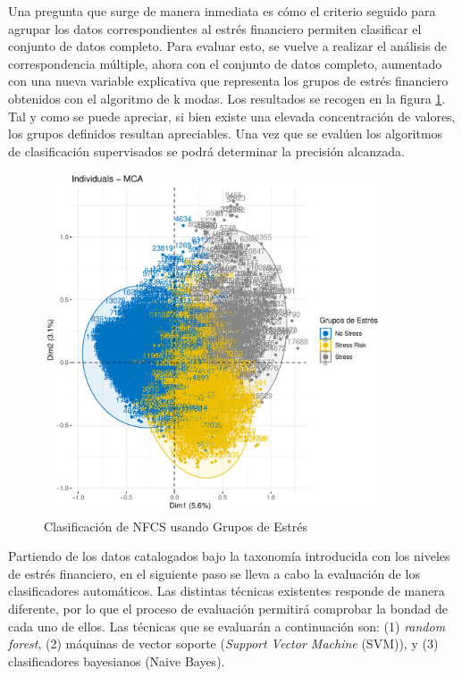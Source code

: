 \documentclass[a4paper, 11pt]{article}
\begin{document}
Una pregunta que surge de manera inmediata es cómo el criterio seguido para agrupar los datos
correspondientes al estrés financiero permiten clasificar el conjunto de datos completo. Para
evaluar esto, se vuelve a realizar el análisis de correspondencia múltiple, ahora con el
conjunto de datos completo, aumentado con una nueva variable explicativa que representa 
los grupos de estrés financiero obtenidos con el algoritmo de k modas. Los resultados 
se recogen en la figura \ref{fig:clustering_nfcs_stress}. Tal y como se puede apreciar, si bien
existe una elevada concentración de valores, los grupos definidos resultan apreciables. Una
vez que se evalúen los algoritmos de clasificación supervisados se podrá determinar la 
precisión alcanzada.

\begin{figure}[ht]
    \centering
    \includegraphics[width=0.9\textwidth]{images/clustering_nfcs_stress.pdf} 
    \caption{Clasificación de NFCS usando Grupos de Estrés}
    \label{fig:clustering_nfcs_stress}
\end{figure}

Partiendo de los datos catalogados bajo la taxonomía introducida con los niveles de 
estrés financiero, en el siguiente paso se lleva a cabo la evaluación de los 
clasificadores automáticos. Las distintas técnicas existentes responde de manera 
diferente, por lo que el proceso de evaluación permitirá comprobar la bondad de 
cada uno de ellos. Las técnicas que se evaluarán a continuación son: (1) 
\textit{random forest}, (2) máquinas de vector soporte (\textit{Support 
Vector Machine} (SVM)), y (3) clasificadores bayesianos (Naive Bayes).
\end{document}
